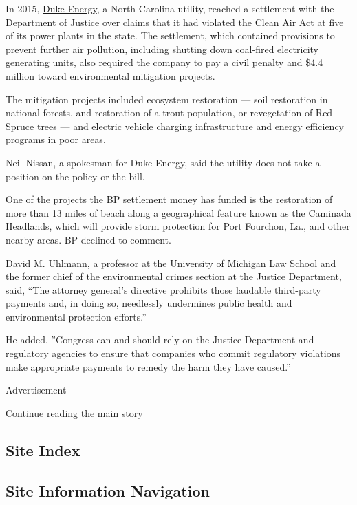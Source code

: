 In 2015,
\href{https://www.nytimes3xbfgragh.onion/topic/company/duke-energy-corporation}{Duke
Energy}, a North Carolina utility, reached a settlement with the
Department of Justice over claims that it had violated the Clean Air Act
at five of its power plants in the state. The settlement, which
contained provisions to prevent further air pollution, including
shutting down coal-fired electricity generating units, also required the
company to pay a civil penalty and \$4.4 million toward environmental
mitigation projects.

The mitigation projects included ecosystem restoration --- soil
restoration in national forests, and restoration of a trout population,
or revegetation of Red Spruce trees --- and electric vehicle charging
infrastructure and energy efficiency programs in poor areas.

Neil Nissan, a spokesman for Duke Energy, said the utility does not take
a position on the policy or the bill.

One of the projects the
\href{https://www.nytimes3xbfgragh.onion/interactive/2015/07/02/us/bp-oil-spill-settlement-background.html?mcubz=1}{BP
settlement money} has funded is the restoration of more than 13 miles of
beach along a geographical feature known as the Caminada Headlands,
which will provide storm protection for Port Fourchon, La., and other
nearby areas. BP declined to comment.

David M. Uhlmann, a professor at the University of Michigan Law School
and the former chief of the environmental crimes section at the Justice
Department, said, ``The attorney general's directive prohibits those
laudable third-party payments and, in doing so, needlessly undermines
public health and environmental protection efforts.''

He added, ''Congress can and should rely on the Justice Department and
regulatory agencies to ensure that companies who commit regulatory
violations make appropriate payments to remedy the harm they have
caused.''

Advertisement

\protect\hyperlink{after-bottom}{Continue reading the main story}

\hypertarget{site-index}{%
\subsection{Site Index}\label{site-index}}

\hypertarget{site-information-navigation}{%
\subsection{Site Information
Navigation}\label{site-information-navigation}}

